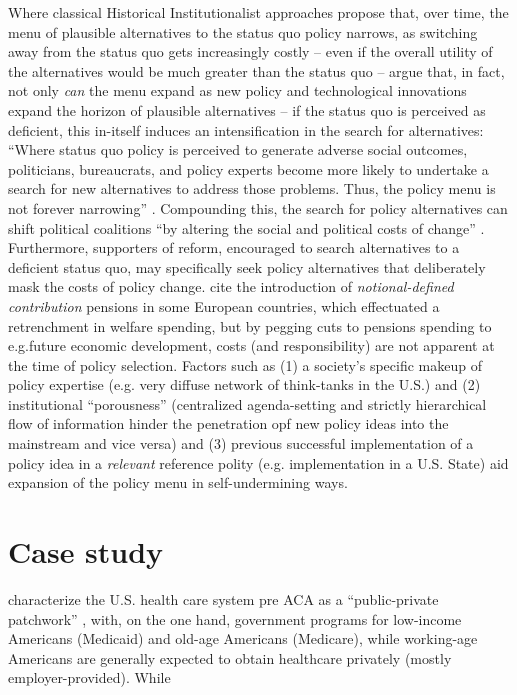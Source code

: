 \documentclass[11pt]{article}
\begin{document}
Where classical Historical Institutionalist approaches propose that, over time, the menu of plausible alternatives to the status quo policy narrows, as switching away from the status quo gets increasingly costly -- even if the overall utility of the alternatives would be much greater than the status quo --\textcite[][]{Jacobs2014} argue that, in fact, not only \textit{can} the menu expand as new policy and technological innovations expand the horizon of plausible alternatives -- if the status quo is perceived as deficient, this in-itself induces an intensification in the search for alternatives: \enquote{Where status quo policy is perceived to generate adverse social outcomes, politicians, bureaucrats, and policy experts become more likely to undertake a search for new alternatives to address those problems. Thus, the policy menu is not forever narrowing} . Compounding this, the search for policy alternatives can shift political coalitions \enquote{by altering the social and political costs of change} \parencite[][p. 449]{Jacobs2014}. Furthermore, supporters of reform, encouraged to search alternatives to a deficient status quo, may specifically seek policy alternatives that deliberately mask the costs of policy change. \textcite[][]{Jacobs2014} cite the introduction of \textit{notional-defined contribution} pensions in some European countries, which effectuated a retrenchment in welfare spending, but by pegging cuts to pensions spending to e.g.future economic development, costs (and responsibility) are not apparent at the time of policy selection. Factors such as (1) a society's specific makeup of policy expertise (e.g. very diffuse network of think-tanks in the U.S.) and (2) institutional \enquote{porousness} \parencite[][p. 449]{Jacobs2014} (centralized agenda-setting and strictly hierarchical flow of information hinder the penetration opf new policy ideas into the mainstream and vice versa) and (3) previous successful implementation of a policy idea in a \textit{relevant} reference polity (e.g. implementation in a U.S. State) aid expansion of the policy menu in self-undermining ways.


\section*{Case study}

\textcite[][]{Jacobs2014} characterize the U.S. health care system pre ACA as a \enquote{public-private patchwork} , with, on the one hand, government programs for low-income Americans (Medicaid) and old-age Americans (Medicare), while working-age Americans are generally expected to obtain healthcare privately (mostly employer-provided). While
\end{document}
